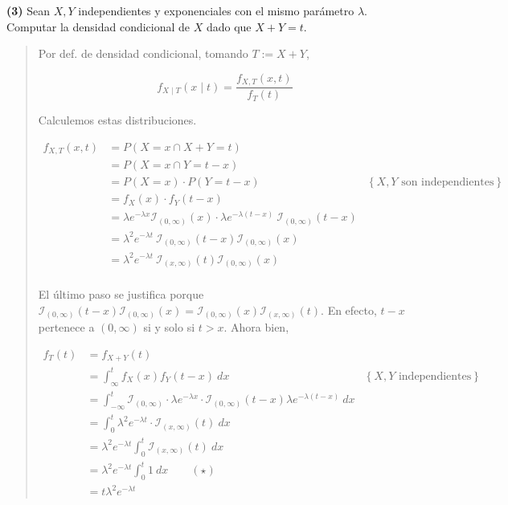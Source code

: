 \documentclass[a4paper, 12pt]{article}
\begin{document}
\pagebreak

\textbf{(3)} Sean $X, Y$ independientes y exponenciales con el mismo parámetro
$\lambda$. Computar la densidad
condicional de $X$ dado que $X + Y = t$.


\small
\begin{quote}

Por def. de densidad condicional, tomando $T := X + Y$,

  \begin{equation*}
    f_{X \mid T}(x\mid t) = \frac{f_{X, T}(x, t)}{f_T(t)} 
  \end{equation*}

Calculemos estas distribuciones.

\begin{align*}
  f_{X, T}(x, t) 
  &= P(X = x \cap X + Y = t) \\ 
  &= P(X = x \cap Y = t - x) \\ 
  &=P(X = x) \cdot P(Y = t - x) &\left\{ X, Y \text{ son independientes}
  \right\} \\ 
  &= f_X(x) \cdot f_Y(t - x) \\ 
  &= \lambda e^{-\lambda x} \mathcal{I}_{(0, \infty)}(x) \cdot \lambda e^{-\lambda(t - x)} ~ \mathcal{I}_{(0,
  \infty)}(t-x)\\ 
  &= \lambda^2e^{-\lambda t} ~ \mathcal{I}_{(0, \infty)}(t-x) \mathcal{I}_{(0,
  \infty)}(x) \\ 
  &= \lambda^2e^{-\lambda t} ~ \mathcal{I}_{(x, \infty)}(t) \mathcal{I}_{(0,
  \infty)}(x) \\ 
\end{align*}

El último paso se justifica porque $\mathcal{I}_{(0, \infty)}(t-x)\mathcal{I}_{(0,
\infty)}(x) = \mathcal{I}_{(0, \infty)}(x) \mathcal{I}_{(x, \infty)}(t)$. En
efecto, $t - x$ pertenece a $(0, \infty)$ si y solo si $t > x$. Ahora bien,

\begin{align*}
  f_T(t) 
  &= f_{X+Y}(t) \\ 
  &= \int_{\infty}^t f_X(x) f_Y(t - x) ~ dx &\left\{ X, Y \text{ independientes}
  \right\} \\ 
  &= \int_{-\infty}^t \mathcal{I}_{(0, \infty)} \cdot \lambda e^{-\lambda x}
  \cdot \mathcal{I}_{(0, \infty)}(t-x) \lambda
  e^{-\lambda(t - x)} ~ dx \\ 
  &=\int_0^t \lambda^2 e^{-\lambda t} \cdot 
  \mathcal{I}_{(x, \infty)}(t) ~ dx \\ 
  &=\lambda^2 e^{-\lambda  t} \int_0^t \mathcal{I}_{(x, \infty)}(t)~ dx \\ 
  &=\lambda^2 e^{-\lambda  t} \int_0^t 1 ~ dx \qquad (\star)\\ 
  &=t\lambda^2 e^{-\lambda  t} 
\end{align*}


\end{quote}
\end{document}
